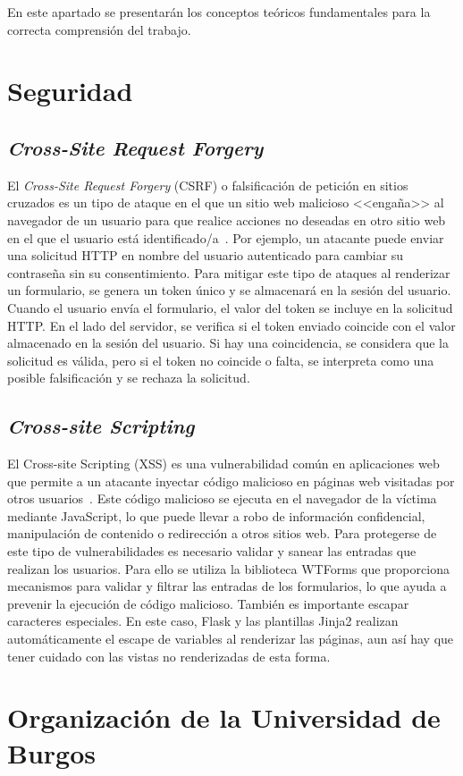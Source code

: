 
En este apartado se presentarán los conceptos teóricos fundamentales para la correcta comprensión del trabajo.

\section{Seguridad}
\subsection{\textit{Cross-Site Request Forgery}}
El \textit{Cross-Site Request Forgery} (CSRF) o  falsificación de petición en sitios cruzados es un tipo de ataque en el que un sitio web malicioso <<engaña>> al navegador de un usuario para que realice acciones no deseadas en otro sitio web en el que el usuario está identificado/a~\cite{wiki:csrf}.
Por ejemplo, un atacante puede enviar una solicitud HTTP en nombre del usuario autenticado para cambiar su contraseña sin su consentimiento.
Para mitigar este tipo de ataques al renderizar un formulario, se genera un token único y se almacenará en la sesión del usuario.
Cuando el usuario envía el formulario, el valor del token se incluye en la solicitud HTTP. 
En el lado del servidor, se verifica si el token enviado coincide con el valor almacenado en la sesión del usuario. 
Si hay una coincidencia, se considera que la solicitud es válida, pero si el token no coincide o falta, se interpreta como una posible falsificación y se rechaza la solicitud.

\subsection{\textit{Cross-site Scripting}}
El Cross-site Scripting (XSS) es una vulnerabilidad común en aplicaciones web que permite a un atacante inyectar código malicioso en páginas web visitadas por otros usuarios~\cite{wiki:xss}.
Este código malicioso se ejecuta en el navegador de la víctima mediante JavaScript, lo que puede llevar a robo de información confidencial, manipulación de contenido o redirección a otros sitios web.
Para protegerse de este tipo de vulnerabilidades es necesario validar y sanear las entradas que realizan los usuarios. 
Para ello se utiliza la biblioteca WTForms que proporciona mecanismos para validar y filtrar las entradas de los formularios, lo que ayuda a prevenir la ejecución de código malicioso.
También es importante escapar caracteres especiales.
En este caso, Flask y las plantillas Jinja2 realizan automáticamente el escape de variables al renderizar las páginas, aun así hay que tener cuidado con las vistas no renderizadas de esta forma.

\section{Organización de la Universidad de Burgos}
